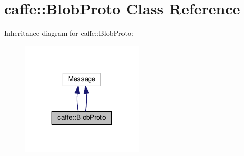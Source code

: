 \hypertarget{classcaffe_1_1_blob_proto}{}\section{caffe\+:\+:Blob\+Proto Class Reference}
\label{classcaffe_1_1_blob_proto}


Inheritance diagram for caffe\+:\+:Blob\+Proto\+:
\nopagebreak
\begin{figure}[H]
\begin{center}
\leavevmode
\includegraphics[width=167pt]{classcaffe_1_1_blob_proto__inherit__graph}
\end{center}
\end{figure}
